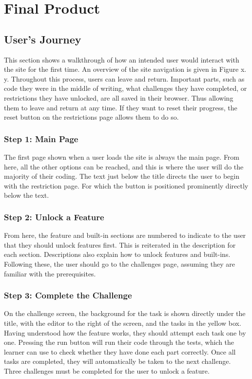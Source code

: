 \section{Final Product}

\subsection{User's Journey}

This section shows a walkthrough of how an intended user would interact with the site for the first time. An overview of the site navigation is given in Figure x. y. Throughout this process, users can leave and return. Important parts, such as code they were in the middle of writing, what challenges they have completed, or restrictions they have unlocked, are all saved in their browser. Thus allowing them to leave and return at any time. If they want to reset their progress, the reset button on the restrictions page allows them to do so.

\subsubsection{Step 1: Main Page}

The first page shown when a user loads the site is always the main page. From here, all the other options can be reached, and this is where the user will do the majority of their coding. The text just below the title directs the user to begin with the restriction page. For which the button is positioned prominently directly below the text.

\subsubsection{Step 2: Unlock a Feature}

From here, the feature and built-in sections are numbered to indicate to the user that they should unlock features first. This is reiterated in the description for each section. Descriptions also explain how to unlock features and built-ins. Following these, the user should go to the challenges page, assuming they are familiar with the prerequisites.

\subsubsection{Step 3: Complete the Challenge}

On the challenge screen, the background for the task is shown directly under the title, with the editor to the right of the screen, and the tasks in the yellow box. Having understood how the feature works, they should attempt each task one by one. Pressing the run button will run their code through the tests, which the learner can use to check whether they have done each part correctly. Once all tasks are completed, they will automatically be taken to the next challenge. Three challenges must be completed for the user to unlock a feature.

